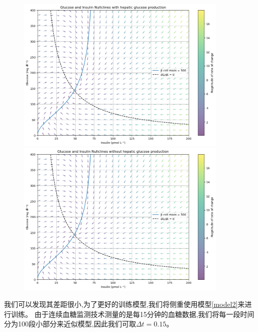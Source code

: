 \begin{figure}[H]
    \begin{minipage}[t]{0.5\textwidth}
        \centering
        \includegraphics[width=0.9\textwidth]{Img/phase_300.png}
    \end{minipage}
    \begin{minipage}[t]{0.5\textwidth}
        \centering
        \includegraphics[width=0.9\textwidth]{Img/phase_hepatic.png}
    \end{minipage}
\end{figure}
我们可以发现其差距很小,为了更好的训练模型,我们将侧重使用模型\ref{model2}来进行训练。
由于连续血糖监测技术测量的是每15分钟的血糖数据,我们将每一段时间分为100段小部分来近似模型,因此我们可取$\Delta t = 0.15$。

